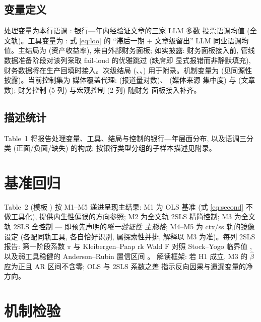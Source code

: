 \subsection{变量定义}
处理变量为本行语调 : 银行—年内经验证文章的三家 LLM 多数
投票语调均值 (全文轨)。工具变量为 : 式 \eqref{eq:loo}
的 ``滞后一期 + 文章级留出'' LLM 同业语调均值。主结局为  (资产收益率), 来自外部财务面板;
如实披露: 财务面板接入前, 管线数据准备阶段对该列采取 fail-loud 的优雅跳过 (缺席即
显式报错而非静默填充), 财务数据将在生产回填时接入。次级结局
(、、)
用于附录。机制变量为  (见同源性披露)。当前控制集为
媒体覆盖代理:  (报道量对数)、 (媒体来源
集中度) 与  (文章数); 财务控制 (5 列) 与宏观控制 (2 列) 随财务
面板接入补齐。

\subsection{描述统计}
Table~1 将报告处理变量、工具、结局与控制的银行—年层面分布, 以及语调三分类
(正面/负面/缺失) 的构成; 按银行类型分组的子样本描述见附录。

\section{基准回归}\label{sec:main}

Table~2 (模板 ) 按 M1--M5 递进呈现主结果:
M1 为 OLS 基准 (式 \eqref{eq:second} 不做工具化), 提供内生性偏误的方向参照;
M2 为全文轨 2SLS 精简控制; M3 为全文轨 2SLS 全控制 --- 即预先声明的\emph{唯一验证性
主规格}; M4--M5 为 ctx/ss 轨的镜像设定 (各配同轨工具, 各自恰好识别, 属探索性并排,
解释以 M3 为准)。每列 2SLS 报告: 第一阶段系数 $\pi$ 与 Kleibergen--Paap rk Wald F
\parencite{kleibergen2006rank} 对照 Stock--Yogo 临界值 \parencite{stock2005weak},
以及弱工具稳健的 Anderson--Rubin 置信区间 \parencite{andrews2019weakiv}。
解读框架: 若 H1 成立, M3 的 $\hat\beta$ 应为正且 AR 区间不含零; OLS 与 2SLS 系数之差
指示反向因果与遗漏变量的净方向。

\section{机制检验}\label{sec:mech}

